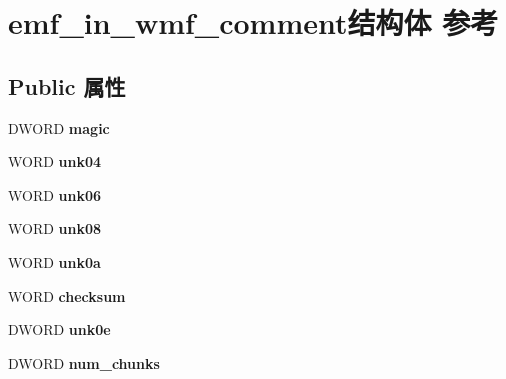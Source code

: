 \hypertarget{structemf__in__wmf__comment}{}\section{emf\+\_\+in\+\_\+wmf\+\_\+comment结构体 参考}
\label{structemf__in__wmf__comment}
\subsection*{Public 属性}
\begin{DoxyCompactItemize}
\item 
\mbox{\label{structemf__in__wmf__comment_adeb03ba5e22c855f51af3d9d034289fc}} 
D\+W\+O\+RD {\bfseries magic}
\item 
\mbox{\label{structemf__in__wmf__comment_a50d5ef1ff54d0aee9da86df730f1a45e}} 
W\+O\+RD {\bfseries unk04}
\item 
\mbox{\label{structemf__in__wmf__comment_a3fa63529d1a0e4ae63135cc0c65bf906}} 
W\+O\+RD {\bfseries unk06}
\item 
\mbox{\label{structemf__in__wmf__comment_aff5b26a2e1b34f08d90073d49b024b60}} 
W\+O\+RD {\bfseries unk08}
\item 
\mbox{\label{structemf__in__wmf__comment_a052772dc4a2c59bbf9d32f065540b118}} 
W\+O\+RD {\bfseries unk0a}
\item 
\mbox{\label{structemf__in__wmf__comment_a0fa8de2ccca5957d4ebd8a454357f8ce}} 
W\+O\+RD {\bfseries checksum}
\item 
\mbox{\label{structemf__in__wmf__comment_a0d18e515129b222f0c1bd9ced0ed0301}} 
D\+W\+O\+RD {\bfseries unk0e}
\item 
\mbox{\label{structemf__in__wmf__comment_a9afd818d2f69f8e753de95d67c8e57fd}} 
D\+W\+O\+RD {\bfseries num\+\_\+chunks}
\item 
\mbox{\label{structemf__in__wmf__comment_ad44d2a12075ea539c49e8a477bf732ba}} 

\end{DoxyCompactItemize}
